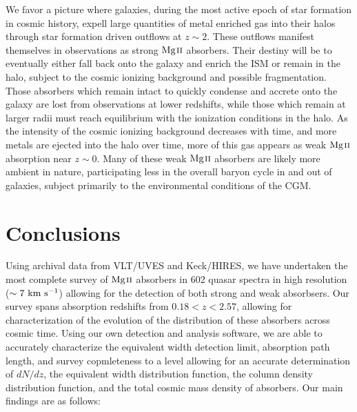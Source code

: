 \documentclass[iop,apj,numberedappendix,appendixfloats,twocolappendix]{emulateapj}
\begin{document}
We favor a picture where galaxies, during the most active epoch of star formation in cosmic history, expell large quantities of metal enriched gas into their halos through star formation driven outflows at $z \sim 2$. These outflows manifest themselves in observations as strong ${\hbox{{\rm Mg}\kern 0.1em{\sc ii}}}$ absorbers. Their destiny will be to eventually either fall back onto the galaxy and enrich the ISM or remain in the halo, subject to the cosmic ionizing background and possible fragmentation. Those absorbers which remain intact to quickly condense and accrete onto the galaxy are lost from observations at lower redshifts, while those which remain at larger radii must reach equilibrium with the ionization conditions in the halo. As the intensity of the cosmic ionizing background decreases with time, and more metals are ejected into the halo over time, more of this gas appears as weak ${\hbox{{\rm Mg}\kern 0.1em{\sc ii}}}$ absorption near $z \sim 0$. Many of these weak ${\hbox{{\rm Mg}\kern 0.1em{\sc ii}}}$ absorbers are likely more ambient in nature, participating less in the overall baryon cycle in and out of galaxies, subject primarily to the environmental conditions of the CGM. 

\section{Conclusions}
\label{sec:conclusions}

Using archival data from VLT/UVES and Keck/HIRES, we have undertaken the most complete survey of ${\hbox{{\rm Mg}\kern 0.1em{\sc ii}}}$ absorbers in 602 quasar spectra in high resolution ($\sim 7~\mathrm{\hbox{km~s$^{-1}$}}$) allowing for the detection of both strong and weak {\MgII} absorbsers. Our survey spans absorption redshifts from $0.18 < z < 2.57$, allowing for characterization of the evolution of the distribution of these absorbers across cosmic time. Using our own detection and analysis software, we are able to accurately characterize the equivalent width detection limit, absorption path length, and survey copmleteness to a level allowing for an accurate determination of $dN\!/dz$, the equivalent width distribution function, the column density distribution function, and the total cosmic mass density of {\MgII} absorbers. Our main findings are as follows:
\end{document}
